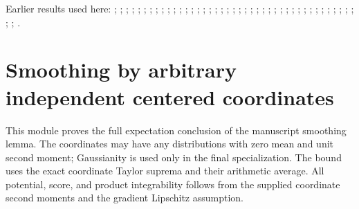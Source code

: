 \documentclass[11pt,a4paper]{report}
\begin{document}
Earlier results used here: \cite[Section~3.13.12]{LangevinLean2026ULASC}; \cite[Section~3.13.2]{LangevinLean2026ULASC}; \cite[Section~3.13.3]{LangevinLean2026ULASC}; \cite[Section~3.13.9]{LangevinLean2026ULASC}; \cite[Section~3.17.1]{LangevinLean2026ULASC}; \cite[Section~3.17.12]{LangevinLean2026ULASC}; \cite[Section~3.17.2]{LangevinLean2026ULASC}; \cite[Section~3.17.3]{LangevinLean2026ULASC}; \cite[Section~3.17.4]{LangevinLean2026ULASC}; \cite[Section~3.22.17]{LangevinLean2026ULASC}; \cite[Section~3.22.18]{LangevinLean2026ULASC}; \cite[Section~3.22.19]{LangevinLean2026ULASC}; \cite[Section~3.22.2]{LangevinLean2026ULASC}; \cite[Section~3.22.20]{LangevinLean2026ULASC}; \cite[Section~3.22.21]{LangevinLean2026ULASC}; \cite[Section~3.22.22]{LangevinLean2026ULASC}; \cite[Section~3.22.23]{LangevinLean2026ULASC}; \cite[Section~3.22.3]{LangevinLean2026ULASC}; \cite[Section~3.22.7]{LangevinLean2026ULASC}; \cite[Section~3.22.8]{LangevinLean2026ULASC}; \cite[Section~3.23.1]{LangevinLean2026ULASC}; \cite[Section~3.23.2]{LangevinLean2026ULASC}; \cite[Section~3.25.1]{LangevinLean2026ULASC}; \cite[Section~3.25.2]{LangevinLean2026ULASC}; \cite[Section~3.25.6]{LangevinLean2026ULASC}; \cite[Section~3.26.3]{LangevinLean2026ULASC}; \cite[Section~3.29.7]{LangevinLean2026ULASC}; \cite[Section~3.29.8]{LangevinLean2026ULASC}; \cite[Section~3.32.12]{LangevinLean2026ULASC}; \cite[Section~3.32.13]{LangevinLean2026ULASC}; \cite[Section~3.32.15]{LangevinLean2026ULASC}; \cite[Section~3.32.16]{LangevinLean2026ULASC}; \cite[Section~3.32.17]{LangevinLean2026ULASC}; \cite[Section~3.32.19]{LangevinLean2026ULASC}; \cite[Section~3.36.7]{LangevinLean2026ULASC}; \cite[Section~3.42.6]{LangevinLean2026ULASC}; \cite[Section~3.42.7]{LangevinLean2026ULASC}; \cite[Section~3.8.11]{LangevinLean2026ULASC}; \cite[Section~3.8.16]{LangevinLean2026ULASC}; \cite[Section~3.8.17]{LangevinLean2026ULASC}; \cite[Section~3.8.19]{LangevinLean2026ULASC}; \cite[Section~3.8.20]{LangevinLean2026ULASC}; \cite[Section~3.8.21]{LangevinLean2026ULASC}; \cite[Section~3.8.22]{LangevinLean2026ULASC}.
\section{\texorpdfstring{Smoothing by arbitrary independent centered coordinates}{Smoothing by arbitrary independent centered coordinates}}
\label{proof-module-AverageLMC-Smoothing-lean}


This module proves the full expectation conclusion of the manuscript smoothing lemma. The coordinates may have any distributions with zero mean and unit second moment; Gaussianity is used only in the final specialization. The bound uses the exact coordinate Taylor suprema and their arithmetic average. All potential, score, and product integrability follows from the supplied coordinate second moments and the gradient Lipschitz assumption.
\end{document}

